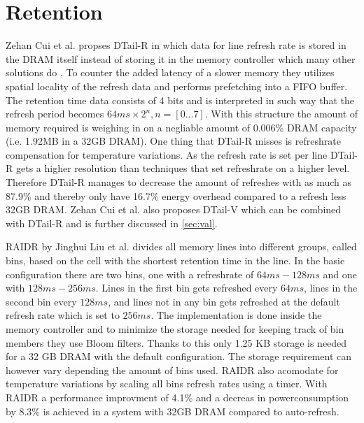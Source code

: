 \section{Retention}
\label{sec:ret}

Zehan Cui et al. \cite{dtail} propses DTail-R in which data for line refresh rate is stored in the DRAM itself instead of storing it in the memory controller which many other solutions do \cite{raidr}\cite{smartrefresh}\cite{refrint}. To counter the added latency of a slower memory they utilizes spatial locality of the refresh data and performs prefetching into a FIFO buffer. The retention time data consists of 4 bits and is interpreted in such way that the refresh period becomes \(64ms \times 2^n, n = [0...7]\). With this structure the amount of memory required is weighing in on a negliable amount of 0.006\% DRAM capacity (i.e. 1.92MB in a 32GB DRAM). One thing that DTail-R misses is refreshrate compensation for temperature variations. As the refresh rate is set per line DTail-R gets a higher resolution than techniques that set refreshrate on a higher level. Therefore DTail-R manages to decrease the amount of refreshes with as much as 87.9\% and thereby only have 16.7\% energy overhead compared to a refresh less 32GB DRAM. Zehan Cui et al. also proposes DTail-V \cite{dtail} which can be combined with DTail-R and is further discussed in \ref{sec:val}.

RAIDR by Jinghui Liu et al. \cite{raidr} divides all memory lines into different groups, called bins, based on the cell with the shortest retention time in the line. In the basic configuration there are two bins, one with a refreshrate of \(64ms - 128ms\) and one with \(128ms - 256ms\). Lines in the first bin gets refreshed every \(64ms\), lines in the second bin every \(128ms\), and lines not in any bin gets refreshed at the default refresh rate which is set to \(256ms\). The implementation is done inside the memory controller and to minimize the storage needed for keeping track of bin members they use Bloom filters. Thanks to this only 1.25 KB storage is needed for a 32 GB DRAM with the default configuration. The storage requirement can however vary depending the amount of bins used. RAIDR also acomodate for temperature variations by scaling all bins refresh rates using a timer. With RAIDR a performance improvment of 4.1\% and a decreas in powerconsumption by 8.3\% is achieved in a system with 32GB DRAM compared to auto-refresh.
  
